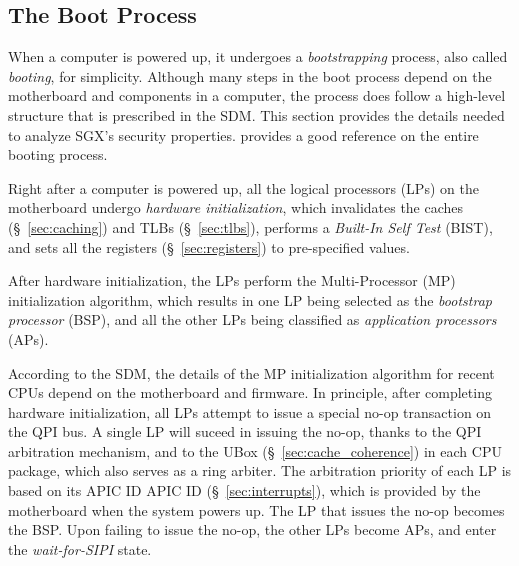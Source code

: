 \subsection{The Boot Process}
\label{sec:booting}

When a computer is powered up, it undergoes a \textit{bootstrapping} process,
also called \textit{booting}, for simplicity. Although many steps in the boot
process depend on the motherboard and components in a computer, the process
does follow a high-level structure that is prescribed in the SDM. This section
provides the details needed to analyze SGX's security properties.
\cite{intel2010booting} provides a good reference on the entire booting
process.


Right after a computer is powered up, all the logical processors (LPs) on the
motherboard undergo \textit{hardware initialization}, which invalidates the
caches (\S~\ref{sec:caching}) and TLBs (\S~\ref{sec:tlbs}), performs a
\textit{Built-In Self Test} (BIST), and sets all the registers
(\S~\ref{sec:registers}) to pre-specified values.


After hardware initialization, the LPs perform the Multi-Processor (MP)
initialization algorithm, which results in one LP being selected as the
\textit{bootstrap processor} (BSP), and all the other LPs being classified as
\textit{application processors} (APs).

According to the SDM, the details of the MP initialization algorithm for recent
CPUs depend on the motherboard and firmware. In principle, after completing
hardware initialization, all LPs attempt to issue a special no-op transaction
on the QPI bus. A single LP will suceed in issuing the no-op, thanks to
the QPI arbitration mechanism, and to the UBox (\S~\ref{sec:cache_coherence})
in each CPU package, which also serves as a ring arbiter. The arbitration
priority of each LP is based on its APIC ID APIC ID (\S~\ref{sec:interrupts}),
which is provided by the motherboard when the system powers up. The LP that
issues the no-op becomes the BSP. Upon failing to issue the no-op, the other
LPs become APs, and enter the \textit{wait-for-SIPI} state.



